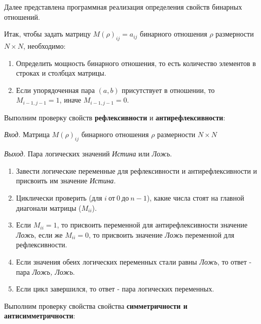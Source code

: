 \documentclass[bachelor, och, labwork]{shiza}
\begin{document}
Далее представлена программная реализация определения свойств бинарных 
отношений.

Итак, чтобы задать матрицу $M(\rho)_{ij}=a_{ij}$ бинарного отношения $\rho$ размерности
$N \times N$, необходимо:

\begin{enumerate}

    \item Определить мощность бинарного отношения, то есть количество
    элементов в строках и столбцах матрицы.

    \item Если упорядоченная пара $(a, b)$ присутствует в отношении, то 
    $M_{i-1,j-1} = 1$, иначе $M_{i-1,j-1} = 0$.

\end{enumerate}

Выполним проверку свойств \textbf{рефлексивности} и \textbf{антирефлексивности}:

\textit{Вход.} Матрица $M(\rho)_{ij}$ бинарного отношения $\rho$ размерности
$N \times N$

\textit{Выход.} Пара логических значений \textit{Истина} или \textit{Ложь}.

\begin{enumerate}
    
    \item Завести логические переменные для рефлексивности и антирефлексивности и присвоить
    им значение \textit{Истина}.
    
    \item Циклически проверить (для $i ~\text{от}~ 0 ~\text{до}~ n-1$), какие 
    числа стоят на главной диагонали матрицы ($M_{ii}$).

    \item Если $M_{ii} = 1$, то присвоить переменной для антирефлексивности значение
    \textit{Ложь}, если же $M_{ii} = 0$, то присвоить значение \textit{Ложь} переменной для
    рефлексивности.

    \item Если значения обеих логических переменных стали равны \textit{Ложь}, то
    ответ - пара \textit{Ложь, Ложь}.
    
    \item Если цикл завершился, то ответ - пара логических переменных.

\end{enumerate}


Выполним проверку свойства свойства \textbf{симметричности и антисимметричности}:
\end{document}

